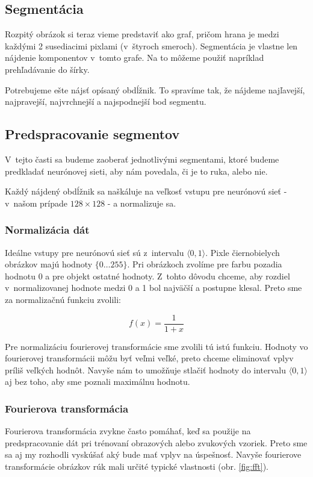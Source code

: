 \subsection{Segmentácia}
\label{chap:segment}
Rozpitý obrázok si teraz vieme predstaviť ako graf, pričom hrana je medzi každými 2 susediacimi pixlami (v~štyroch smeroch). Segmentácia je vlastne len nájdenie komponentov v~tomto grafe. Na to môžeme použiť napríklad prehľadávanie do šírky. 

Potrebujeme ešte nájsť opísaný obdĺžnik. To spravíme tak, že nájdeme najľavejší, najpravejší, najvrchnejší a najspodnejší bod segmentu.

\subsection{Predspracovanie segmentov}
\label{sect:segmentpreprocessing}

V~tejto časti sa budeme zaoberať jednotlivými segmentami, ktoré budeme predkladať neurónovej sieti, aby nám povedala, či je to ruka, alebo nie.

Každý nájdený obdĺžnik sa naškáluje na veľkosť vstupu pre neurónovú sieť - v~našom prípade $128\times 128$ - a normalizuje sa. 

\subsubsection{Normalizácia dát} 
\label{chap:normalisation}
Ideálne vstupy pre neurónovú sieť sú z~intervalu $\langle 0,1\rangle$. Pixle čiernobielych obrázkov majú hodnoty $\{0\dots 255\}$. Pri obrázkoch zvolíme pre farbu pozadia hodnotu 0 a pre objekt ostatné hodnoty. Z~tohto dôvodu chceme, aby rozdiel v~normalizovanej hodnote medzi 0 a 1 bol najväčší a postupne klesal. Preto sme za normalizačnú funkciu zvolili:

$$f(x)=\frac{1}{1+x}$$

Pre normalizáciu fourierovej transformácie sme zvolili tú istú funkciu. Hodnoty vo fourierovej transformácii môžu byť veľmi veľké, preto chceme eliminovať vplyv príliš veľkých hodnôt. Navyše nám to umožňuje stlačiť hodnoty do intervalu $\langle 0,1\rangle$ aj bez toho, aby sme poznali maximálnu hodnotu.

\subsubsection{Fourierova transformácia}
\label{chap:ft}
Fourierova transformácia zvykne často pomáhať, keď sa použije na predspracovanie dát pri trénovaní obrazových alebo zvukových vzoriek. Preto sme sa aj my rozhodli vyskúšať aký bude mať vplyv na úspešnosť. Navyše fourierove transformácie obrázkov rúk mali určité typické vlastnosti (obr. \ref{fig:fft}).

